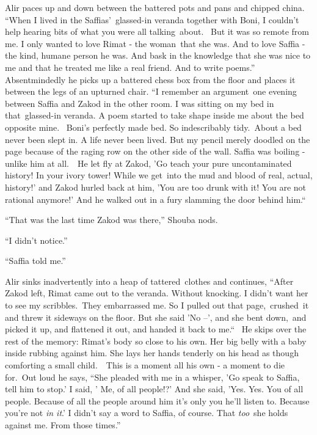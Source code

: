 \documentclass[twoside,11pt]{book}
\begin{document}
Alir paces up and down between the battered pots and pans and chipped china. ``When I lived in the
Saffias'\ glassed-in veranda together with Boni, I couldn't help hearing bits of what you were all talking~about.~ But
it was so remote from me. I only wanted to love Rimat - the woman\ that she was. And to love Saffia - the kind, humane
person he was. And bask in the knowledge that she was nice to me and that he treated me like a real friend. And to
write poems.'' Absentmindedly he picks up a battered chess box from the floor and places it between the
legs of an upturned chair. ``I remember an argument~one evening between Saffia and Zakod in the other
room. I was sitting on my bed in that\ glassed-in veranda. A poem started to take shape inside me about the bed
opposite mine.~ Boni's perfectly made bed. So indescribably tidy.\ About a bed never been slept in. A life never been
lived. But my pencil merely doodled on the page because of the raging row on the other side of the wall. Saffia was
boiling - unlike him at all.\ \ He let fly at Zakod, 'Go teach your pure uncontaminated history! In your ivory tower!
While we get~into the mud and blood of real, actual, history!' and Zakod hurled back at him, 'You are too drunk with
it! You are not rational anymore!{}' And he walked out in a fury slamming the door behind him.``\ 

``That was the last time Zakod was there,'' Shouba nods.

``I didn't notice.'' 

``Saffia told me.''

Alir sinks inadvertently into a heap of tattered~clothes and continues, ``After Zakod left, Rimat came out
to the veranda. Without knocking. I didn't want her to see my scribbles.\ They embarrassed me. So I pulled out that
page,\ crushed\ it and threw it sideways on the floor. But she said 'No --', and she bent down,\ and picked it up, and
flattened it out, and handed it back to me.``~ He skips over the rest of the memory: Rimat's body so close
to his own. Her big belly with a baby inside rubbing against him. She lays her hands tenderly on his head as though
comforting a small child.\ \ This is a moment all his own - a moment to die for.\ Out loud he says, ``She
pleaded with me in a whisper, 'Go speak to Saffia, tell him to stop.' I said, ' Me, of all people!?' And she said,
'Yes. Yes. You of all people. Because of all the people around him it's only you he'll listen to. Because you're not
\textit{in it}.' I didn't say a word to Saffia, of course. That \textit{too}\ she holds against me. From those
times.'' 
\end{document}
